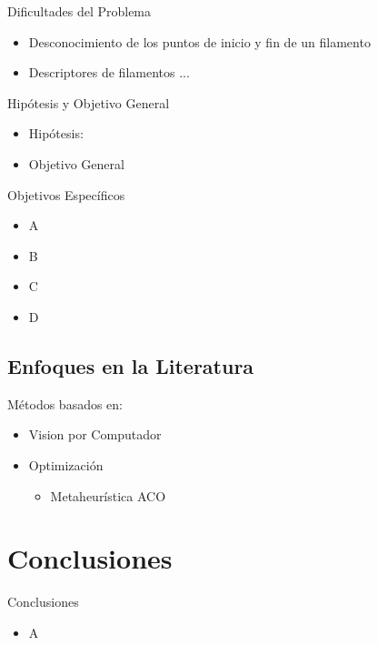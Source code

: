\documentclass[]{beamer}
\begin{document}
\begin{frame}{Dificultades del Problema}
    \begin{itemize}
        \item Desconocimiento de los puntos de inicio y fin de un filamento
        \item Descriptores de filamentos ...
    \end{itemize}
\end{frame}

\begin{frame}{Hip\'otesis y Objetivo General}
\begin{itemize}
    \item Hip\'otesis:
    \vspace{1cm}
    \item Objetivo General
\end{itemize}
    
\end{frame}

\begin{frame}{Objetivos Espec\'ificos}
\begin{itemize}
    \item A
    \item B
    \item C
    \item D
\end{itemize}
    
\end{frame}

\subsection{Enfoques en la Literatura}
\begin{frame}{M\'etodos basados en:}
    \begin{itemize}
        \item Vision por Computador
        \item Optimizaci\'on
        \begin{itemize}
            \item Metaheur\'istica ACO
        \end{itemize}
    \end{itemize}
\end{frame}






\section{Conclusiones}
\begin{frame}{Conclusiones}
    \begin{itemize}
        \item A
    \end{itemize}
\end{frame}
\end{document}
